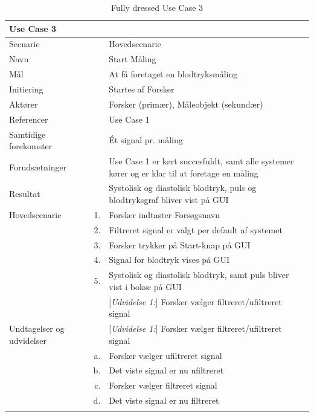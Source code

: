 \begin{longtabu} to  %
    {\large \textbf{Use Case 3}} && \\
    \toprule
    Scenarie 	&& Hovedscenarie\\
    Navn 		&& Start Måling\\
    Mål 		&& At få foretaget en blodtryksmåling\\
    Initiering 	&& Startes af Forsker\\
    Aktører 	&& Forsker (primær), Måleobjekt (sekundær)\\
    Referencer 	&& Use Case 1\\
    Samtidige forekomster  && Ét signal pr. måling\\
    Forudsætninger 	&& Use Case 1 er kørt succesfuldt, samt alle systemer kører og er klar til at foretage en måling\\ 
    Resultat 		&& Systolisk og diastolisk blodtryk, puls og blodtryksgraf bliver vist på GUI\\ \midrule
    Hovedscenarie &    1. &		Forsker indtaster Forsøgsnavn\\[-1ex]
    &     2. & 	Filtreret signal er valgt per default af systemet\\	 	
                &    3. & Forsker trykker på Start-knap på GUI\\[-1ex]
                &    4. & Signal for blodtryk vises på GUI\\[-1ex]
                &    5. & Systolisk og diastolisk blodtryk, samt puls bliver vist i bokse på GUI\\ 
                &    & [\textit{Udvidelse 1:}] Forsker vælger filtreret/ufiltreret signal	\\ \midrule
                
    Undtagelser og udvidelser && [\textit{Udvidelse 1:}]	Forsker vælger filtreret/ufiltreret signal\\ 
    &	a. & Forsker vælger ufiltreret signal\\
    &   b. & Det viste signal er nu ufiltreret \\
    & 	c. & Forsker vælger filtreret signal \\
    &	d. & Det viste signal er nu filtreret \\   
    \bottomrule
\caption{Fully dressed Use Case 3}
\label{UC3}
\end{longtabu}


